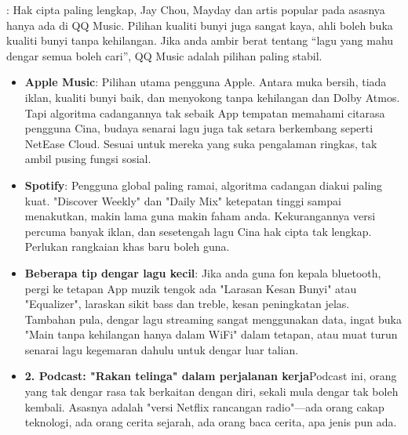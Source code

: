 


: Hak cipta paling lengkap, Jay Chou, Mayday dan artis popular pada asasnya hanya ada di QQ Music. Pilihan kualiti bunyi juga sangat kaya, ahli boleh buka kualiti bunyi tanpa kehilangan. Jika anda ambir berat tentang “lagu yang mahu dengar semua boleh cari”, QQ Music adalah pilihan paling stabil.

\begin{itemize}
  \item \textbf{Apple Music}: Pilihan utama pengguna Apple. Antara muka bersih, tiada iklan, kualiti bunyi baik, dan menyokong tanpa kehilangan dan Dolby Atmos. Tapi algoritma cadangannya tak sebaik App tempatan memahami citarasa pengguna Cina, budaya senarai lagu juga tak setara berkembang seperti NetEase Cloud. Sesuai untuk mereka yang suka pengalaman ringkas, tak ambil pusing fungsi sosial.
  \item \textbf{Spotify}: Pengguna global paling ramai, algoritma cadangan diakui paling kuat. "Discover Weekly" dan "Daily Mix" ketepatan tinggi sampai menakutkan, makin lama guna makin faham anda. Kekurangannya versi percuma banyak iklan, dan sesetengah lagu Cina hak cipta tak lengkap. Perlukan rangkaian khas baru boleh guna.
  \item \textbf{Beberapa tip dengar lagu kecil}: Jika anda guna fon kepala bluetooth, pergi ke tetapan App muzik tengok ada "Larasan Kesan Bunyi" atau "Equalizer", laraskan sikit bass dan treble, kesan peningkatan jelas. Tambahan pula, dengar lagu streaming sangat menggunakan data, ingat buka "Main tanpa kehilangan hanya dalam WiFi" dalam tetapan, atau muat turun senarai lagu kegemaran dahulu untuk dengar luar talian.
  \item \textbf{2. Podcast: "Rakan telinga" dalam perjalanan kerja}Podcast ini, orang yang tak dengar rasa tak berkaitan dengan diri, sekali mula dengar tak boleh kembali. Asasnya adalah "versi Netflix rancangan radio"—ada orang cakap teknologi, ada orang cerita sejarah, ada orang baca cerita, apa jenis pun ada.
\end{itemize}

